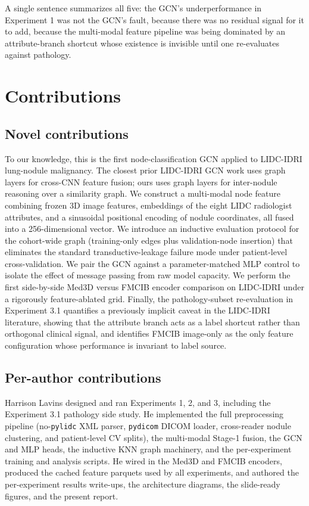 \documentclass[10pt,letterpaper,twocolumn]{article}
\begin{document}
A single sentence summarizes all five: the GCN's underperformance in Experiment 1 was not the GCN's fault, because there was no residual signal for it to add, because the multi-modal feature pipeline was being dominated by an attribute-branch shortcut whose existence is invisible until one re-evaluates against pathology.

\section{Contributions}
\label{sec:contributions}

\subsection{Novel contributions}

To our knowledge, this is the first node-classification GCN applied to LIDC-IDRI lung-nodule malignancy. The closest prior LIDC-IDRI GCN work uses graph layers for cross-CNN feature fusion; ours uses graph layers for inter-nodule reasoning over a similarity graph. We construct a multi-modal node feature combining frozen 3D image features, embeddings of the eight LIDC radiologist attributes, and a sinusoidal positional encoding of nodule coordinates, all fused into a 256-dimensional vector. We introduce an inductive evaluation protocol for the cohort-wide graph (training-only edges plus validation-node insertion) that eliminates the standard transductive-leakage failure mode under patient-level cross-validation. We pair the GCN against a parameter-matched MLP control to isolate the effect of message passing from raw model capacity. We perform the first side-by-side Med3D versus FMCIB encoder comparison on LIDC-IDRI under a rigorously feature-ablated grid. Finally, the pathology-subset re-evaluation in Experiment 3.1 quantifies a previously implicit caveat in the LIDC-IDRI literature, showing that the attribute branch acts as a label shortcut rather than orthogonal clinical signal, and identifies FMCIB image-only as the only feature configuration whose performance is invariant to label source.

\subsection{Per-author contributions}

Harrison Lavins designed and ran Experiments 1, 2, and 3, including the Experiment 3.1 pathology side study. He implemented the full preprocessing pipeline (no-\texttt{pylidc} XML parser, \texttt{pydicom} DICOM loader, cross-reader nodule clustering, and patient-level CV splits), the multi-modal Stage-1 fusion, the GCN and MLP heads, the inductive KNN graph machinery, and the per-experiment training and analysis scripts. He wired in the Med3D and FMCIB encoders, produced the cached feature parquets used by all experiments, and authored the per-experiment results write-ups, the architecture diagrams, the slide-ready figures, and the present report.
\end{document}
